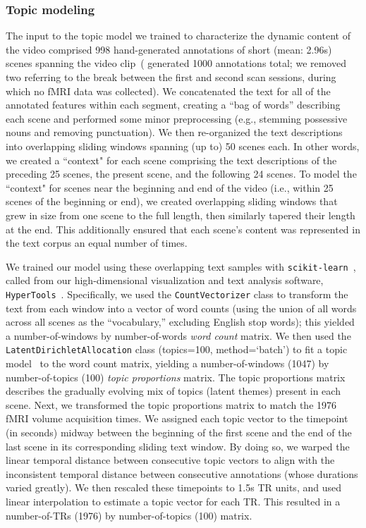 \documentclass{article}
\begin{document}
\subsubsection*{Topic modeling}
The input to the topic model we trained to characterize the dynamic content of the video comprised 998 hand-generated annotations of short (mean: 2.96s) scenes spanning the video clip~(\citealp{ChenEtal17} generated 1000 annotations total; we removed two referring to the break between the first and second scan sessions, during which no fMRI data was collected).  We concatenated the text for all of the annotated features within each segment, creating a ``bag of words'' describing each scene and performed some minor preprocessing (e.g., stemming possessive nouns and removing punctuation).  We then re-organized the text descriptions into overlapping sliding windows spanning (up to) 50 scenes each.  In other words, we created a ``context" for each scene comprising the text descriptions of the preceding 25 scenes, the present scene, and the following 24 scenes.  To model the ``context" for scenes near the beginning and end of the video (i.e., within 25 scenes of the beginning or end), we created overlapping sliding windows that grew in size from one scene to the full length, then similarly tapered their length at the end.  This additionally ensured that each scene's content was represented in the text corpus an equal number of times.

We trained our model using these overlapping text samples with \texttt{scikit-learn}~\citep[version 0.19.1; ][]{PedrEtal11}, called from our high-dimensional visualization and text analysis software, \texttt{HyperTools}~\citep{HeusEtal18a}.  Specifically, we used the \texttt{CountVectorizer} class to transform the text from each window into a vector of word counts (using the union of all words across all scenes as the ``vocabulary,'' excluding English stop words); this yielded a number-of-windows by number-of-words \textit{word count} matrix.  We then used the \texttt{LatentDirichletAllocation} class (topics=100, method=`batch') to fit a topic model~\citep{BleiEtal03} to the word count matrix, yielding a number-of-windows (1047) by number-of-topics (100) \textit{topic proportions} matrix.  The topic proportions matrix describes the gradually evolving mix of topics (latent themes) present in each scene.  Next, we transformed the topic proportions matrix to match the 1976 fMRI volume acquisition times.  We assigned each topic vector to the timepoint (in seconds) midway between the beginning of the first scene and the end of the last scene in its corresponding sliding text window.  By doing so, we warped the linear temporal distance between consecutive topic vectors to align with the inconsistent temporal distance between consecutive annotations (whose durations varied greatly).  We then rescaled these timepoints to 1.5s TR units, and used linear interpolation to estimate a topic vector for each TR.  This resulted in a number-of-TRs (1976) by number-of-topics (100) matrix.
\end{document}
